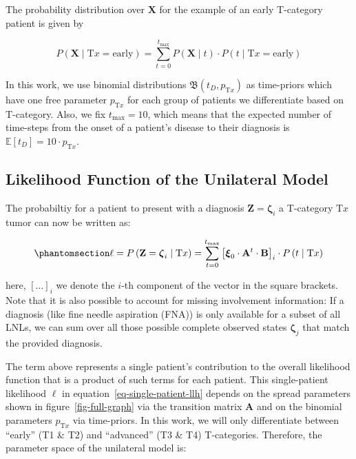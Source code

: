 \documentclass[
  sn-mathphys-num,
]{sn-jnl}
\begin{document}
The probability distribution over \(\mathbf{X}\) for the example of an
early T-category patient is given by

\[
P\left( \mathbf{X} \mid \text{T}x = \text{early} \right) = \sum_{t=0}^{t_\text{max}} P \left( \mathbf{X} \mid t \right) \cdot P(t \mid \text{T}x = \text{early})
\]

In this work, we use binomial distributions
\(\mathfrak{B} \left( t_D, p_{\text{T}x} \right)\) as time-priors which
have one free parameter \(p_{\text{T}x}\) for each group of patients we
differentiate based on T-category. Also, we fix \(t_\text{max} = 10\),
which means that the expected number of time-steps from the onset of a
patient's disease to their diagnosis is
\(\mathbb{E}\left[ t_D \right] = 10 \cdot p_{\text{T}x}\).

\subsection{Likelihood Function of the Unilateral
Model}\label{likelihood-function-of-the-unilateral-model}

The probabiltiy for a patient to present with a diagnosis
\(\mathbf{Z} = \boldsymbol{\zeta}_i\) a T-category \(\text{T}x\) tumor
can now be written as:

\begin{equation}\phantomsection\label{eq-single-patient-llh}{
\ell = P \left( \mathbf{Z} = \boldsymbol{\zeta}_i \mid \text{T}x \right) = \sum_{t=0}^{t_\text{max}} \left[ \boldsymbol{\xi}_0 \cdot \mathbf{A}^t \cdot \mathbf{B} \right]_i \cdot P \left( t \mid \text{T}x \right)
}\end{equation}

here, \(\left[ \ldots \right]_i\) we denote the \(i\)-th component of
the vector in the square brackets. Note that it is also possible to
account for missing involvement information: If a diagnosis (like fine
needle aspiration (FNA)) is only available for a subset of all LNLs, we
can sum over all those possible complete observed states
\(\boldsymbol{\zeta}_j\) that match the provided diagnosis.

The term above represents a single patient's contribution to the overall
likelihood function that is a product of such terms for each patient.
This single-patient likelihood \(\ell\) in
equation~\ref{eq-single-patient-llh} depends on the spread parameters
shown in figure~\ref{fig-full-graph} via the transition matrix
\(\mathbf{A}\) and on the binomial parameters \(p_{\text{T}x}\) via
time-priors. In this work, we will only differentiate between ``early''
(T1 \& T2) and ``advanced'' (T3 \& T4) T-categories. Therefore, the
parameter space of the unilateral model is:
\end{document}
